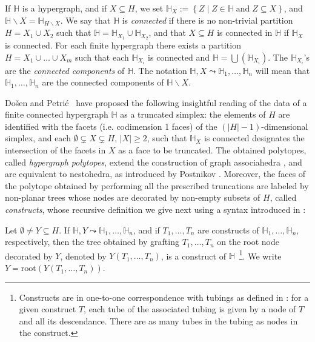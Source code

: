 \documentclass[10pt]{amsart}
\theoremstyle{definition}
\theoremstyle{remark}
\numberwithin{equation}{section}
\newcommand{\set}[1]{\left\{#1\right\}}
\newcommand{\0}{\color{blue}{\mathsf{0}}}
\newcommand{\inc}{\subseteq}
\newcommand{\incs}{\subsetneq}
\newcommand{\union}{\cup}
\newcommand{\Union}{\bigcup}
\newcommand{\setc}[2]{\set{#1 \mid #2}}
\newcommand{\hyper}[1]{{\mathbb #1}}
\newcommand{\restrH}[2]{\hyper{#1}\backslash #2}
\begin{document}
\smallskip
 
If $\hyper{H}$ is a hypergraph,  and if  $X\inc H$, we set
$\hyper{H}_X:=\setc{Z}{Z\in \hyper{H}\;\mbox{and}\; Z\inc X}$, and $\restrH{H}{X}=\hyper{H}_{H\backslash X}$.
We say that $\hyper{H}$ is {\em connected} if there is no non-trivial partition $H=X_1\union X_2$ such that $\hyper{H}=\hyper{H}_{X_1}\union \hyper{H}_{X_2}$, and that $X\inc H$ is connected in $\hyper{H}$ if $\hyper{H}_X$ is connected.
For each finite hypergraph there exists a partition
$H=X_1\union\ldots\union X_m$ such that each $\hyper{H}_{X_i}$ is connected and $\hyper{H}=\Union(\hyper{H}_{X_i})$.  The $\hyper{H}_{X_i}$'s are  the {\em connected components} of $\hyper{H}$. The notation
$\hyper{H},X  \leadsto \hyper{H}_1,\ldots, \hyper{H}_n$
 will mean that  $\hyper{H}_1,\ldots,\hyper{H}_n$ are  the
 connected components of $\restrH{H}{X}$.  

\smallskip

Do\v sen and Petri\'c~\cite{DP} have proposed the following insightful reading of the data of a finite connected hypergraph $\hyper{H}$ as a truncated simplex: the elements of $H$ are identified with the facets (i.e. codimension 1 faces) of the $(|H|-1)$-dimensional simplex, and each $\emptyset\incs X\incs H$, $|X|\geq 2$, such that    $\hyper{H}_X$ is connected designates the intersection of the facets in $X$ as a face to be truncated.
The obtained polytopes, called \emph{hypergraph polytopes}, extend the construction of graph associahedra \cite{CD-CCGA, Zel06}, and are equivalent to nestohedra, as introduced by Postnikov \cite{P09}.  Moreover,  the faces of the   polytope obtained by performing  all the prescribed truncations  are labeled by non-planar trees whose nodes are decorated by non-empty subsets of $H$, called {\em constructs}, whose recursive definition  we give next using a syntax introduced in \cite{COI}:

\smallskip
Let  $\emptyset\neq Y\subseteq H$. If   $\hyper{H},Y  \leadsto \hyper{H}_1,\ldots, \hyper{H}_n$, and if  $T_1,\ldots,T_n$ are constructs of $\hyper{H}_1,\ldots,\hyper{H}_n$, respectively, then the tree obtained by grafting $T_1,\ldots,T_n$ on the root node decorated by $Y$, denoted by $Y(T_1,\ldots,T_n)$, is a construct of  $\hyper{H}$~\footnote{\label{construct-tubing} Constructs are in one-to-one correspondence with tubings as defined in \cite{CD-CCGA}: for a given construct $T$, each tube of the associated tubing is given by a node of $T$ and all its descendance. There are  as many tubes in the tubing as nodes in the construct.}. We write $Y=\mbox{root}(Y(T_1,\ldots,T_n))$.
\end{document}

